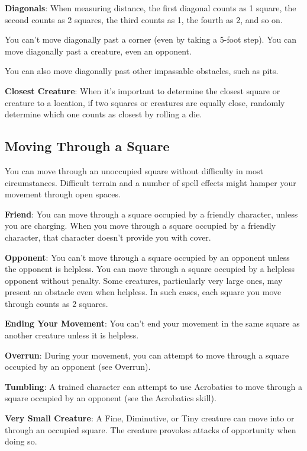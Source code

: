\textbf{Diagonals}: When measuring distance, the first diagonal counts as 1 square, the second counts as 2 squares, the third counts as 1, the fourth as 2, and so on.
				
You can't move diagonally past a corner (even by taking a 5-foot step). You can move diagonally past a creature, even an opponent.
				
You can also move diagonally past other impassable obstacles, such as pits.
				
\textbf{Closest Creature}: When it's important to determine the closest square or creature to a location, if two squares or creatures are equally close, randomly determine which one counts as closest by rolling a die.
				
\subsection{Moving Through a Square}

				
You can move through an unoccupied square without difficulty in most circumstances. Difficult terrain and a number of spell effects might hamper your movement through open spaces.
				
\textbf{Friend}: You can move through a square occupied by a friendly character, unless you are charging. When you move through a square occupied by a friendly character, that character doesn't provide you with cover.
				
\textbf{Opponent}: You can't move through a square occupied by an opponent unless the opponent is helpless. You can move through a square occupied by a helpless opponent without penalty. Some creatures, particularly very large ones, may present an obstacle even when helpless. In such cases, each square you move through counts as 2 squares.
				
\textbf{Ending Your Movement}: You can't end your movement in the same square as another creature unless it is helpless.
				
\textbf{Overrun}: During your movement, you can attempt to move through a square occupied by an opponent (see Overrun).
				
\textbf{Tumbling}: A trained character can attempt to use Acrobatics to move through a square occupied by an opponent (see the Acrobatics skill).
				
\textbf{Very Small Creature}: A Fine, Diminutive, or Tiny creature can move into or through an occupied square. The creature provokes attacks of opportunity when doing so.
				
